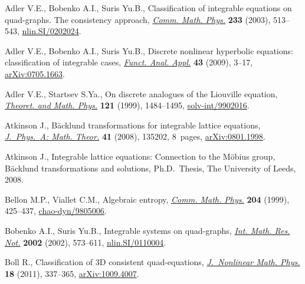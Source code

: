 \documentclass[pdftex]{sigma}
\numberwithin{equation}{section}
\begin{document}
\begin{thebibliography}{99}
\footnotesize\itemsep=0pt

Adler V.E., Bobenko A.I., Suris Yu.B., Classif\/ication of integrable equations on
 quad-graphs. {T}he consistency approach, \href{https://doi.org/10.1007/s00220-002-0762-8}{\textit{Comm. Math. Phys.}}
 \textbf{233} (2003), 513--543, \href{https://arxiv.org/abs/nlin.SI/0202024}{nlin.SI/0202024}.

Adler V.E., Bobenko A.I., Suris Yu.B., Discrete nonlinear hyperbolic equations:
 classif\/ication of integrable cases, \href{https://doi.org/10.1007/s10688-009-0002-5}{\textit{Funct. Anal. Appl.}} \textbf{43}
 (2009), 3--17, \href{https://arxiv.org/abs/0705.1663}{arXiv:0705.1663}.

Adler V.E., Startsev S.Ya., On discrete analogues of the {L}iouville equation,
 \href{https://doi.org/10.1007/BF02557219}{\textit{Theoret. and Math. Phys.}} \textbf{121} (1999), 1484--1495,
 \href{https://arxiv.org/abs/solv-int/9902016}{solv-int/9902016}.

Atkinson J., B\"acklund transformations for integrable lattice equations,
 \href{https://doi.org/10.1088/1751-8113/41/13/135202}{\textit{J.~Phys.~A: Math. Theor.}} \textbf{41} (2008), 135202, 8~pages,
 \href{https://arxiv.org/abs/0801.1998}{arXiv:0801.1998}.

Atkinson J., Integrable lattice equations: {C}onnection to the {M}\"obius
 group, {B}\"acklund transformations and solutions, Ph.D.~Thesis, The
 University of Leeds, 2008.

Bellon M.P., Viallet C.M., Algebraic entropy, \href{https://doi.org/10.1007/s002200050652}{\textit{Comm. Math. Phys.}}
 \textbf{204} (1999), 425--437, \href{https://arxiv.org/abs/chao-dyn/9805006}{chao-dyn/9805006}.

Bobenko A.I., Suris Yu.B., Integrable systems on quad-graphs, \href{https://doi.org/10.1155/S1073792802110075}{\textit{Int. Math.
 Res. Not.}} \textbf{2002} (2002), 573--611, \href{https://arxiv.org/abs/nlin.SI/0110004}{nlin.SI/0110004}.

Boll R., Classif\/ication of 3{D} consistent quad-equations, \href{https://doi.org/10.1142/S1402925111001647}{\textit{J.~Nonlinear
 Math. Phys.}} \textbf{18} (2011), 337--365, \href{https://arxiv.org/abs/1009.4007}{arXiv:1009.4007}.


\end{thebibliography}
\end{document}
